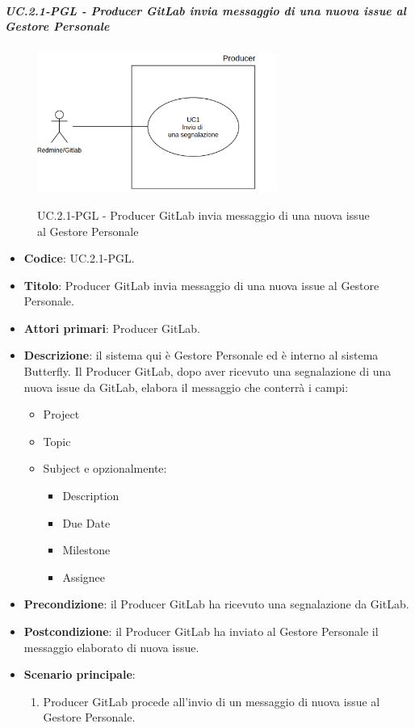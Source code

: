 		\subparagraph{UC\theuccount.2.1-PGL - Producer GitLab invia messaggio di una nuova issue al Gestore Personale}
		\begin{figure}[H]
			\centering
			\includegraphics[width=0.7\textwidth]{img/UC1.png}\\
			\caption{UC\theuccount.2.1-PGL - Producer GitLab invia messaggio di una nuova issue al Gestore Personale}
		\end{figure}
		\begin{itemize}
			\item \textbf{Codice}: UC\theuccount.2.1-PGL.
			\item \textbf{Titolo}: Producer GitLab invia messaggio di una nuova issue al Gestore Personale.
			\item \textbf{Attori primari}: Producer GitLab.
			\item \textbf{Descrizione}: il sistema qui è Gestore Personale ed è interno al sistema Butterfly. Il Producer GitLab, dopo
			aver ricevuto una segnalazione di una nuova issue da GitLab, elabora il messaggio che conterrà i campi:
			\begin{itemize}
				\item Project
				\item Topic
				\item Subject e opzionalmente:
				\begin{itemize}
					\item Description
					\item Due Date
					\item Milestone
					\item Assignee
				\end{itemize}
			\end{itemize}
			\item \textbf{Precondizione}: il Producer GitLab ha ricevuto una segnalazione da GitLab.
			\item \textbf{Postcondizione}: il Producer GitLab ha inviato al Gestore Personale il messaggio elaborato di nuova issue.
			\item \textbf{Scenario principale}: 
			\begin{enumerate}
				\item Producer GitLab procede all'invio di un messaggio di
				nuova issue al Gestore Personale.
			\end{enumerate}
			
		\end{itemize}
	
